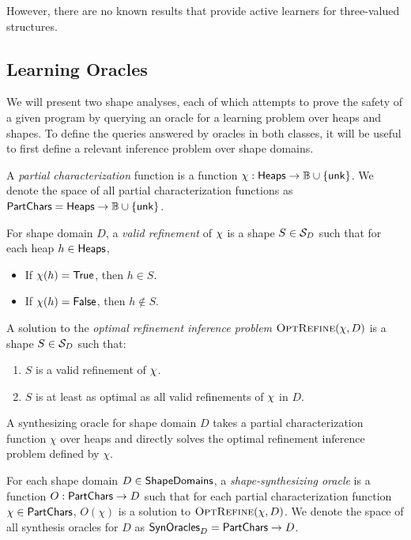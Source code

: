 However, there are no known results that provide active learners for
three-valued structures.

\subsection{Learning Oracles}
%
We will present two shape analyses, each of which attempts to prove
the safety of a given program by querying an oracle for a learning
problem over heaps and shapes.
%
To define the queries answered by oracles in both classes, it will be
useful to first define a relevant inference problem over shape
domains.
\begin{defn}
  A \emph{partial characterization} function is a function $\chi:
  \mathsf{Heaps} \to \mathbb{B} \cup \{ \mathsf{unk} \}$.
  We denote the space of all partial characterization functions as
  $\mathsf{PartChars} = \mathsf{Heaps} \to \mathbb{B} \cup \{ \mathsf{unk} \}$.

  For shape domain $D$, a \emph{valid refinement} of $\chi$ is a
  shape $S \in \mathcal{S}_D$ such that for each heap $h \in \mathsf{Heaps}$,
  \begin{itemize}
  \item
    If $\chi(h) = \mathsf{True}$, then $h \in S$.
  \item
    If $\chi(h) = \mathsf{False}$, then $h \notin S$.
  \end{itemize}

  A solution to the \emph{optimal refinement inference problem}
  $\textsc{OptRefine}(\chi, D)$ is a shape $S \in \mathcal{S}_D$ such that:
  \begin{enumerate}
  \item $S$ is a valid refinement of $\chi$.
  \item $S$ is at least as optimal as all valid refinements of
    $\chi$ in $D$.
  \end{enumerate}
\end{defn}

A synthesizing oracle for shape domain $D$ takes a partial
characterization function $\chi$ over heaps and directly solves the
optimal refinement inference problem defined by $\chi$.
%
\begin{defn}
  \label{defn:syn-oracle}
  For each shape domain $D \in \mathsf{ShapeDomains}$, a
  \emph{shape-synthesizing oracle} is a function $O: \mathsf{PartChars} \to
  D$ such that for each partial characterization function $\chi
  \in \mathsf{PartChars}$, $O(\chi)$ is a solution to $\textsc{OptRefine}(\chi, D)$.
  We denote the space of all synthesis oracles for $D$ as
  $\mathsf{SynOracles}_D = \mathsf{PartChars} \to D$.
\end{defn}

